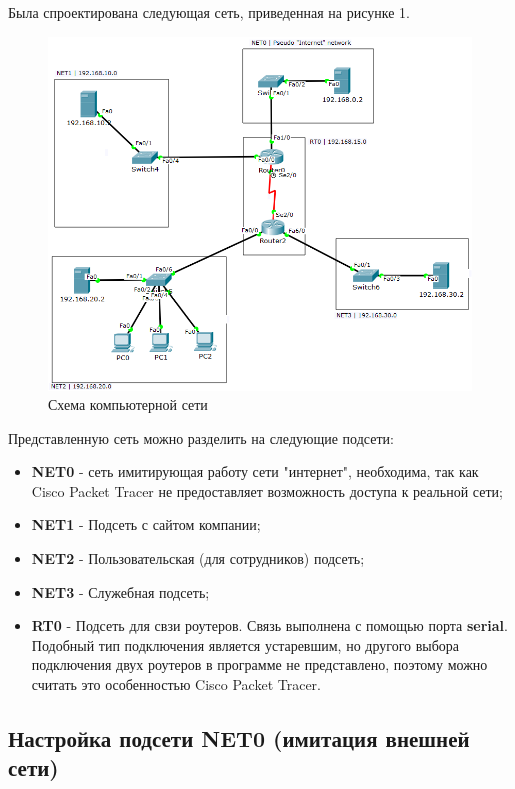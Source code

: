 Была спроектирована следующая сеть, приведенная на рисунке 1.
\begin{figure}[H]
  \centering
  \includegraphics[width=\textwidth]{img/scheme}
  \caption{Схема компьютерной сети}
\end{figure}
Представленную сеть можно разделить на следующие подсети:
\begin{itemize}
\item \textbf{NET0} - сеть имитирующая работу сети "интернет", необходима, так как Cisco Packet Tracer не предоставляет возможность доступа к реальной сети;
\item \textbf{NET1} - Подсеть с сайтом компании;
\item \textbf{NET2} - Пользовательская (для сотрудников) подсеть;
\item \textbf{NET3} - Служебная подсеть;
\item \textbf{RT0} - Подсеть для свзи роутеров. Связь выполнена с помощью порта \textbf{serial}. Подобный тип подключения является устаревшим, но другого выбора подключения двух роутеров в программе не представлено, поэтому можно считать это особенностью Cisco Packet Tracer.
\end{itemize}
\subsection{Настройка подсети NET0 (имитация внешней сети)}
